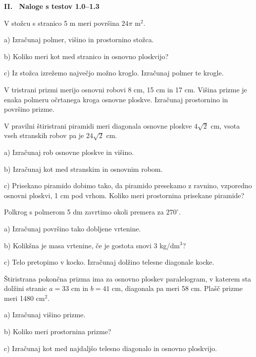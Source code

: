 \documentclass[a4paper,11pt]{letter}
\newcommand{\razdelek}[1]{%
  \vspace{0.5cm}
  \begin{center}
  \colorbox{brown!25}{\parbox{0.97\textwidth}{\centering\vspace{2pt}\large\textbf{#1}\vspace{2pt}}}
  \end{center}
  \vspace{0.2cm}
}
\begin{document}
\razdelek{II. \ Naloge s testov 1.0--1.3}

\begin{naloga}
V stožcu s stranico 5 m meri površina $24\pi$ m$^2$.

a) Izračunaj polmer, višino in prostornino stožca.

b) Koliko meri kot med stranico in osnovno ploskvijo?

c) Iz stožca izrežemo največjo možno kroglo. Izračunaj polmer te krogle.
\end{naloga}

\begin{naloga}
V tristrani prizmi merijo osnovni robovi 8 cm, 15 cm in 17 cm.
Višina prizme je enaka polmeru očrtanega kroga osnovne ploskve.
Izračunaj prostornino in površino prizme.
\end{naloga}

\begin{naloga}
V pravilni štiristrani piramidi meri diagonala osnovne ploskve $4\sqrt{2}$ cm,
vsota vseh stranskih robov pa je $24\sqrt{2}$ cm.

a) Izračunaj rob osnovne ploskve in višino.

b) Izračunaj kot med stranskim in osnovnim robom.

c) Prisekano piramido dobimo tako, da piramido presekamo z ravnino, vzporedno osnovni ploskvi,
1 cm pod vrhom. Koliko meri prostornina prisekane piramide?
\end{naloga}

\begin{naloga}
Polkrog s polmerom 5 dm zavrtimo okoli premera za $270^{\circ}$.

a) Izračunaj površino tako dobljene vrtenine.

b) Kolikšna je masa vrtenine, če je gostota snovi $3$ kg/dm$^3$?

c) Telo pretopimo v kocko. Izračunaj dolžino telesne diagonale kocke.
\end{naloga}

\begin{naloga}
Štiristrana pokončna prizma ima za osnovno ploskev paralelogram, v katerem sta dolžini stranic
$a=33$ cm in $b=41$ cm, diagonala pa meri 58 cm. Plašč prizme meri 1480 cm$^2$.

a) Izračunaj višino prizme.

b) Koliko meri prostornina prizme?

c) Izračunaj kot med najdaljšo telesno diagonalo in osnovno ploskvijo.
\end{naloga}
\end{document}
